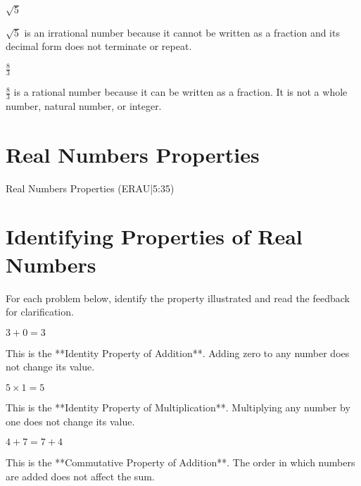 \documentclass{ximera}
\begin{document}
\begin{problem}
$\sqrt{5}$

\begin{feedback}
$\sqrt{5}$ is an irrational number because it cannot be written as a fraction and its decimal form does not terminate or repeat.
\end{feedback}
\end{problem}

\begin{problem}
$\frac{8}{3}$

\begin{feedback}
$\frac{8}{3}$ is a rational number because it can be written as a fraction. It is not a whole number, natural number, or integer.
\end{feedback}
\end{problem}

\section*{Real Numbers Properties}

Real Numbers Properties (ERAU|5:35)

\section*{Identifying Properties of Real Numbers}

For each problem below, identify the property illustrated and read the feedback for clarification.

\begin{problem}
$3 + 0 = 3$

\begin{feedback}
This is the **Identity Property of Addition**. Adding zero to any number does not change its value.
\end{feedback}
\end{problem}

\begin{problem}
$5 \times 1 = 5$

\begin{feedback}
This is the **Identity Property of Multiplication**. Multiplying any number by one does not change its value.
\end{feedback}
\end{problem}

\begin{problem}
$4 + 7 = 7 + 4$

\begin{feedback}
This is the **Commutative Property of Addition**. The order in which numbers are added does not affect the sum.
\end{feedback}
\end{problem}
\end{document}
